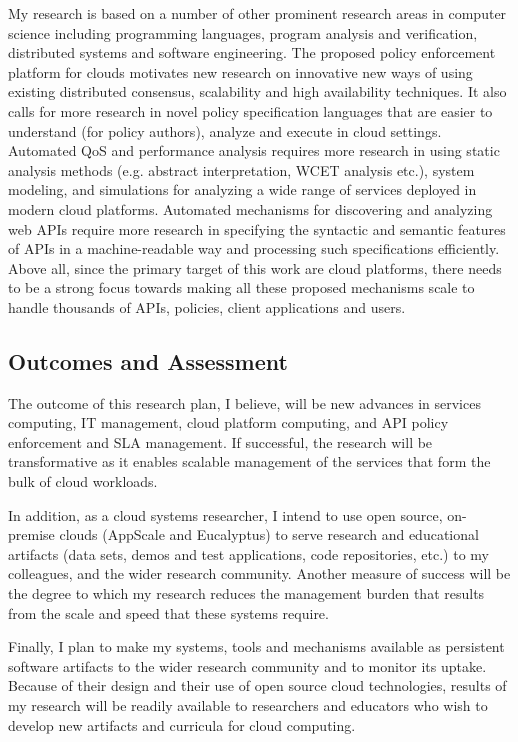 \documentclass[10pt]{article}
\begin{document}
My research is based on a number of other prominent research areas in computer
science including programming languages, program analysis and verification, 
distributed systems and software engineering. The proposed policy enforcement
platform for clouds motivates new research on innovative new ways of using existing
distributed consensus, scalability and high availability techniques. It also calls for
more research in novel policy specification languages that
are easier to understand (for policy authors), analyze and execute in cloud settings.
Automated QoS and performance analysis requires more research in using
static analysis methods (e.g. abstract interpretation, WCET analysis etc.), system modeling,
and simulations for analyzing a wide range of services deployed in modern cloud platforms.
Automated mechanisms for discovering and analyzing web APIs require more research
in specifying the syntactic and semantic features of APIs in a machine-readable way
and processing such specifications efficiently. Above all, since the primary target of this
work are cloud platforms, there needs to be a strong focus towards making all these 
proposed mechanisms scale to handle thousands of APIs, policies, client applications and users.

\subsection{Outcomes and Assessment}

The outcome of this research plan,
I believe, will be new advances in services computing, IT management, cloud
platform computing, and API policy enforcement and SLA management.
If successful, the research will be transformative as it
enables scalable management of the services that form the
bulk of cloud workloads.

In addition,
as a cloud systems researcher, I intend to use open source, on-premise clouds (AppScale
and Eucalyptus) to serve research and educational artifacts (data sets, demos and test applications, 
code repositories, etc.) to my colleagues, 
and the wider research community.  Another measure of success will
be the degree to which my research reduces the management burden that results from
the scale and speed that these systems require.

Finally, I plan to make my systems, tools and mechanisms available as persistent software artifacts to
the wider research community and to monitor its uptake.  Because of their design
and their use of open source cloud technologies, results of my research will be readily available
to researchers and educators who wish to develop new artifacts and curricula
for cloud computing. 
\end{document}
